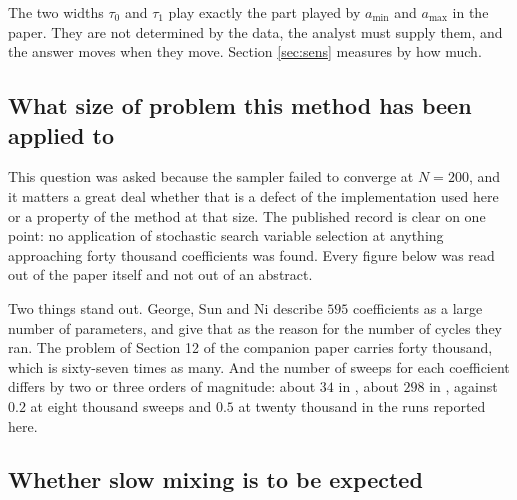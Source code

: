 The two widths $\tau_{0}$ and $\tau_{1}$ play exactly the part played by
$a_{\min}$ and $a_{\max}$ in the paper. They are not determined by the data, the
analyst must supply them, and the answer moves when they move.
Section \ref{sec:sens} measures by how much.

\subsection{What size of problem this method has been applied to}
\label{sec:ssvsscale}

This question was asked because the sampler failed to converge at $N = 200$, and it
matters a great deal whether that is a defect of the implementation used here or a
property of the method at that size. The published record is clear on one point: no
application of stochastic search variable selection at anything approaching forty
thousand coefficients was found. Every figure below was read out of the paper itself
and not out of an abstract.

\begin{center}
\footnotesize
{}
\end{center}

Two things stand out. George, Sun and Ni describe $595$ coefficients as a large
number of parameters, and give that as the reason for the number of cycles they ran.
The problem of Section 12 of the companion paper carries forty thousand, which is
sixty-seven times as many. And the number of sweeps for each coefficient differs by
two or three orders of magnitude: about $34$ in \cite{gsn2008}, about $298$ in
\cite{korobilis2013}, against $0.2$ at eight thousand sweeps and $0.5$ at twenty
thousand in the runs reported here.

\subsection{Whether slow mixing is to be expected}

